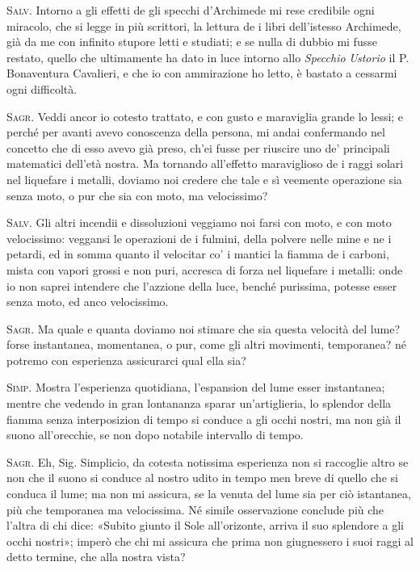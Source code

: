 \documentclass[11pt,twoside,openany]{book}
\newcommand{\speaker}[1]{\textcolor{rubric}{\textsc{#1}}\space}
\begin{document}
\speaker{Salv.} Intorno a gli effetti de gli specchi d'Archimede mi rese credibile ogni miracolo, che si legge in più scrittori, la lettura de i libri dell'istesso Archimede, già da me con infinito stupore letti e studiati; e se nulla di dubbio mi fusse restato, quello che ultimamente ha dato in luce intorno allo \emph{Specchio} \emph{Ustorio} il P. Bonaventura Cavalieri, e che io con ammirazione ho letto, è bastato a cessarmi ogni difficoltà.

\speaker{Sagr.} Veddi ancor io cotesto trattato, e con gusto e maraviglia grande lo lessi; e perché per avanti avevo conoscenza della persona, mi andai confermando nel concetto che di esso avevo già preso, ch'ei fusse per riuscire uno de' principali matematici dell'età nostra. Ma tornando all'effetto maraviglioso de i raggi solari nel liquefare i metalli, doviamo noi credere che tale e sì veemente operazione sia senza moto, o pur che sia con moto, ma velocissimo?

\speaker{Salv.} Gli altri incendii e dissoluzioni veggiamo noi farsi con moto, e con moto velocissimo: veggansi le operazioni de i fulmini, della polvere nelle mine e ne i petardi, ed in somma quanto il velocitar co' i mantici la fiamma de i carboni, mista con vapori grossi e non puri, accresca di forza nel liquefare i metalli: onde io non saprei intendere che l'azzione della luce, benché purissima, potesse esser senza moto, ed anco velocissimo.

\speaker{Sagr.} Ma quale e quanta doviamo noi stimare che sia questa velocità del lume? forse instantanea, momentanea, o pur, come gli altri movimenti, temporanea? né potremo con esperienza assicurarci qual ella sia?

\speaker{Simp.} Mostra l'esperienza quotidiana, l'espansion del lume esser instantanea; mentre che vedendo in gran lontananza sparar un'artiglieria, lo splendor della fiamma senza interposizion di tempo si conduce a gli occhi nostri, ma non già il suono all'orecchie, se non dopo notabile intervallo di tempo.

\speaker{Sagr.} Eh, Sig. Simplicio, da cotesta notissima esperienza non si raccoglie altro se non che il suono si conduce al nostro udito in tempo men breve di quello che si conduca il lume; ma non mi assicura, se la venuta del lume sia per ciò istantanea, più che temporanea ma velocissima. Né simile osservazione conclude più che l'altra di chi dice: «Subito giunto il Sole all'orizonte, arriva il suo splendore a gli occhi nostri»; imperò che chi mi assicura che prima non giugnessero i suoi raggi al detto termine, che alla nostra vista?
\end{document}
